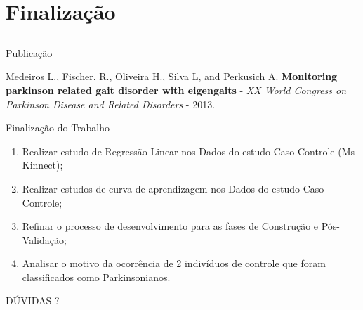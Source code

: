 \documentclass{beamer}
\begin{document}
%
%
%

\section{Finalização}
\subsection{}
\begin{frame}{Publicação}
\begin{block}{}
Medeiros L., Fischer. R., Oliveira H., Silva L, and Perkusich A. \textbf{Monitoring parkinson
related gait disorder with eigengaits} - \textit{XX World Congress on Parkinson Disease and Related Disorders} - 2013.
\end{block}
\end{frame}

\begin{frame}{Finalização do Trabalho}
\begin{enumerate}[<+->]
	\item Realizar estudo de Regressão Linear nos Dados do estudo Caso-Controle (Ms-Kinnect);
	\item Realizar estudos de curva de aprendizagem nos Dados do estudo Caso-Controle;
	\item Refinar o processo de desenvolvimento para as fases de Construção e Pós-Validação;
	\item Analisar o motivo da ocorrência de 2 indivíduos de controle que foram classificados como Parkinsonianos.
\end{enumerate}
\end{frame}


\begin{frame}
  \begin{center}
  DÚVIDAS ?
  \end{center}
\end{frame}

%

\end{document}

